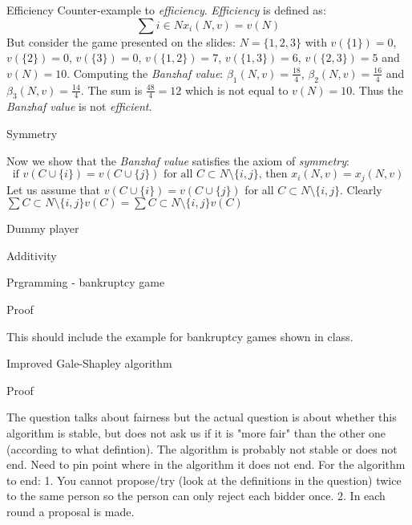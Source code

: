 \documentclass[12pt]{article}
\newenvironment{question}[2][Question]{\begin{trivlist}
\item[\hskip \labelsep {\bfseries #1}\hskip \labelsep {\bfseries #2.}]}{\end{trivlist}}
\newenvironment{answer}[2][Answer]{\begin{trivlist}
\item[\hskip \labelsep {\bfseries #1}\hskip \labelsep {\bfseries #2:}]}{\end{trivlist}}
\begin{document}
\begin{answer}{a)}{Efficiency}
Counter-example to \textit{efficiency}. \textit{Efficiency} is defined as: \\
$$\sum{i \in N}{}{x_i(N,v)=v(N)}$$
But consider the game presented on the slides: $N=\{1,2,3\}$ with $v(\{1\})=0$, $v(\{2\})=0$, $v(\{3\})=0$, $v(\{1,2\})=7$, $v(\{1,3\})=6$, $v(\{2,3\})=5$ and $v(N)=10$. Computing the \textit{Banzhaf value}: $\beta_1(N,v)=\frac{18}{4}$, $\beta_2(N,v)=\frac{16}{4}$ and $\beta_3(N,v)=\frac{14}{4}$. The sum is $\frac{48}{4}=12$ which is not equal to $v(N)=10$. Thus the \textit{Banzhaf value} is not \textit{efficient}.

\end{answer}
\begin{answer}{b)}{Symmetry}

Now we show that the \textit{Banzhaf value} satisfies the axiom of \textit{symmetry}:
$$\text{if }v(C \cup \{i\}) = v(C \cup \{j\}) \text{ for all } C \subset N \setminus \{i,j\} \text{, then } x_i(N,v)=x_j(N,v)$$
Let us assume that $v(C \cup \{i\}) = v(C \cup \{j\})$ for all $C \subset N \setminus \{i,j\}$. Clearly $\sum{C \subset N \setminus \{i,j\}}{}{v(C)}=\sum{C \subset N \setminus \{i,j\}}{}{v(C)}$
\end{answer}
\begin{answer}{c)}{Dummy player}


\end{answer}
\begin{answer}{d)}{Additivity}


\end{answer}
\begin{question}{3}
Prgramming - bankruptcy game
\end{question}
\begin{answer}{a)}{Proof}

This should include the example for bankruptcy games shown in class.
\end{answer}

\begin{question}{5}
Improved Gale-Shapley algorithm
\end{question}
\begin{answer}{a)}{Proof}

The question talks about fairness but the actual question is about whether this algorithm is stable, but does not ask us if it is "more fair" than the other one (according to what defintion).
The algorithm is probably not stable or does not end.
Need to pin point where in the algorithm it does not end.
For the algorithm to end:
1. You cannot propose/try (look at the definitions in the question) twice to the same person so the person can only reject each bidder once.
2. In each round a proposal is made.

\end{answer}
\end{document}
